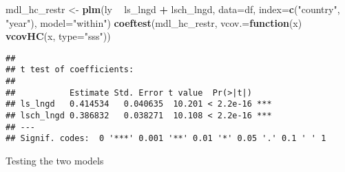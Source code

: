 \documentclass[]{article}
\newenvironment{Shaded}{\begin{snugshade}}{\end{snugshade}}
\newcommand{\KeywordTok}[1]{\textcolor[rgb]{0.13,0.29,0.53}{\textbf{#1}}}
\newcommand{\DataTypeTok}[1]{\textcolor[rgb]{0.13,0.29,0.53}{#1}}
\newcommand{\DecValTok}[1]{\textcolor[rgb]{0.00,0.00,0.81}{#1}}
\newcommand{\StringTok}[1]{\textcolor[rgb]{0.31,0.60,0.02}{#1}}
\newcommand{\ControlFlowTok}[1]{\textcolor[rgb]{0.13,0.29,0.53}{\textbf{#1}}}
\newcommand{\OperatorTok}[1]{\textcolor[rgb]{0.81,0.36,0.00}{\textbf{#1}}}
\newcommand{\NormalTok}[1]{#1}
\begin{document}
\begin{Shaded}
\end{Shaded}

\begin{Shaded}
\begin{Highlighting}[]
\NormalTok{mdl_hc_restr <-}\StringTok{ }\KeywordTok{plm}\NormalTok{(ly }\OperatorTok{~}\StringTok{ }\NormalTok{ls_lngd }\OperatorTok{+}\StringTok{ }\NormalTok{lsch_lngd, }\DataTypeTok{data=}\NormalTok{df, }\DataTypeTok{index=}\KeywordTok{c}\NormalTok{(}\StringTok{"country"}\NormalTok{, }\StringTok{"year"}\NormalTok{), }\DataTypeTok{model=}\StringTok{"within"}\NormalTok{)}
\KeywordTok{coeftest}\NormalTok{(mdl_hc_restr, }\DataTypeTok{vcov.=}\ControlFlowTok{function}\NormalTok{(x) }\KeywordTok{vcovHC}\NormalTok{(x, }\DataTypeTok{type=}\StringTok{"sss"}\NormalTok{))}
\end{Highlighting}
\end{Shaded}

\begin{verbatim}
## 
## t test of coefficients:
## 
##           Estimate Std. Error t value  Pr(>|t|)    
## ls_lngd   0.414534   0.040635  10.201 < 2.2e-16 ***
## lsch_lngd 0.386832   0.038271  10.108 < 2.2e-16 ***
## ---
## Signif. codes:  0 '***' 0.001 '**' 0.01 '*' 0.05 '.' 0.1 ' ' 1
\end{verbatim}

\begin{Shaded}
\end{Shaded}

Testing the two models
\end{document}
